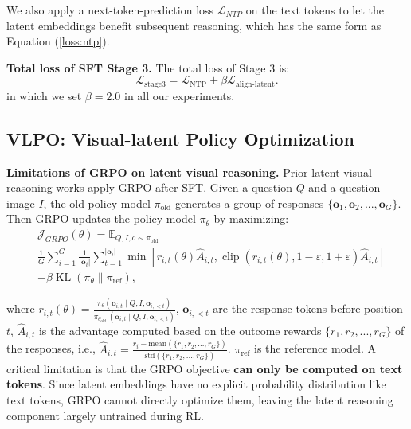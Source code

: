 We also apply a next-token-prediction loss $\mathcal{L}_{NTP}$ on the text tokens to let the latent embeddings benefit subsequent reasoning, which has the same form as Equation (\ref{loss:ntp}).

\textbf{Total loss of SFT Stage 3.} The total loss of Stage 3 is:
\begin{equation}
    \mathcal{L}_{\text{stage3}} = \mathcal{L}_{\text{NTP}} + \beta \mathcal{L}_{\text{align-latent}}.
\end{equation}
in which we set $\beta=2.0$ in all our experiments.





\subsection{VLPO: Visual-latent Policy Optimization}
\label{sec:RL}
\textbf{Limitations of GRPO on latent visual reasoning.} Prior latent visual reasoning works \citep{yang2025machine, li2025latent} apply GRPO \citep{Shao2024DeepSeekMathPT} after SFT. Given a question $Q$ and a question image $I$, the old policy model $\pi_{\text{old}}$ generates a group of responses $\{\mathbf{o}_1, \mathbf{o}_2, ..., \mathbf{o}_G\}$. Then GRPO updates the policy model $\pi_{\theta}$ by maximizing:
\begin{equation}
    \begin{aligned}
        &\mathcal{J}_{GRPO}(\theta)=\mathbb{E}_{Q, I, o\sim \pi_{\text{old}}}\\
        &\frac{1}{G} \sum_{i=1}^G \frac{1}{\left|\mathbf{o}_i\right|} \sum_{t=1}^{\left|\mathbf{o}_i\right|}\min \left[ r_{i,t}(\theta) \hat{A}_{i, t}, \operatorname{clip}\left(r_{i,t}(\theta), 1-\varepsilon, 1+\varepsilon\right) \hat{A}_{i, t}\right]\\
        &-\beta \operatorname{K L}\left(\pi_\theta \| \pi_{\text{ref}}\right),
    \end{aligned}
\end{equation}

where $r_{i,t}(\theta)=\frac{\pi_\theta\left(\mathbf{o}_{i, t} \mid Q, I, \mathbf{o}_{i,<t}\right)}{\pi_{\theta_{\text {old }}}\left(\mathbf{o}_{i, t} \mid Q, I, \mathbf{o}_{i,<t}\right)}$, $\mathbf{o}_{i,<t}$ are the response tokens before position $t$, $\hat{A}_{i, t}$ is the advantage computed based on the outcome rewards $\{r_1,r_2,...,r_G\}$ of the responses, i.e., $\hat{A}_{i, t}=\frac{r_i-\text{mean}(\{r_1,r_2,...,r_G\})}{\text{std}(\{r_1,r_2,...,r_G\})}$. $\pi_{\text{ref}}$ is the reference model. A critical limitation is that the GRPO objective \textbf{can only be computed on text tokens}. Since latent embeddings have no explicit probability distribution like text tokens, GRPO cannot directly optimize them, leaving the latent reasoning component largely untrained during RL.

